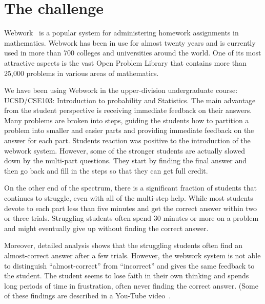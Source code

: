 \documentclass{sigchi}
\begin{document}


\section{The challenge}
Webwork~\cite{WebWork} is a popular system for administering homework
assignments in mathematics. Webwork has been in use for almost twenty
years and is currently used in more than 700 colleges and universities
around the world. One of its most attractive aspects is the vast
Open Problem Library that contains more than 25,000 problems in
various areas of mathematics.

We have been using Webwork in the upper-division undergraduate course:
UCSD/CSE103: Introduction to probability and Statistics. The main
advantage from the student perspective is receiving immediate feedback
on their answers. Many problems are broken into steps, guiding the
students how to partition a problem into smaller and easier parts and
providing immediate feedback on the answer for each part. Students
reaction was positive to the introduction of the webwork
system. However, some of the stronger students are actually slowed
down by the multi-part questions. They start by finding the final
answer and then go back and fill in the steps so that they can get
full credit.

On the other end of the spectrum, there is a significant fraction of
students that continues to struggle, even with all of the multi-step
help.  While most students devote to each part less than five minutes
and get the correct answer within two or three trials. Struggling
students often spend 30 minutes or more on a problem and might
eventually give up without finding the correct answer.

Moreover, detailed analysis shows that the struggling students often
find an almost-correct answer after a few trials. However, the webwork
system is not able to distinguish ``almost-correct'' from
``incorrect'' and gives the same feedback to the student. The student
seems to lose faith in their own thinking and spends long periods of
time in frustration, often never finding the correct answer.  (Some of
these findings are described in a You-Tube video~\cite{ElkherjFr2013}.
\end{document}
